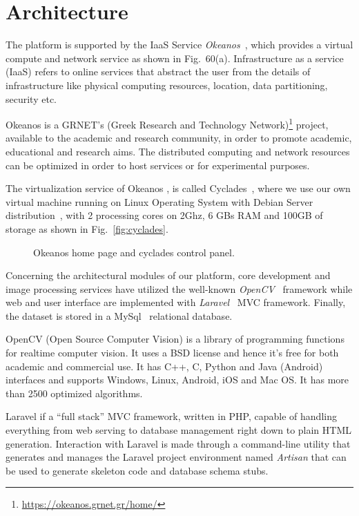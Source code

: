 \newpage
\section{Architecture}\label{architecture}

The platform is supported by the IaaS Service \textit{Okeanos}~\cite{okeanos}, which provides a virtual compute and network service as shown in Fig.~60(a).
Infrastructure as a service (IaaS) refers to online services that abstract the user from the details of infrastructure like physical computing resources, location, data partitioning, security etc.
 
Okeanos is a GRNET's (Greek Research and Technology Network)\footnote{\url{https://okeanos.grnet.gr/home/}} project, available to the academic and research community, in order to promote academic, educational and research aims. The distributed computing and network resources can be optimized in order to host services or for experimental purposes. 

The virtualization service of Okeanos , is called Cyclades~\cite{cyclades}, where we use our own virtual machine running on Linux Operating System with Debian Server distribution~\cite{debian}, with 2 processing cores on 2Ghz, 6 GBs RAM and 100GB of storage as shown in Fig.~\ref{fig:cyclades}.
\begin{figure}
    \centering
    \caption{Okeanos home page and cyclades control panel.}
\end{figure}
Concerning the architectural modules of our platform, core development and image processing services have  utilized the well-known \textit{OpenCV}~\cite{bradski2000opencv} framework while web and user interface are implemented with \textit{Laravel}~\cite{otwell2015laravel} MVC framework. Finally, the dataset is stored in a MySql~\cite{mysql2004mysql} relational database.
 
OpenCV (Open Source Computer Vision) is a library of programming functions for realtime computer vision. It uses a BSD license and hence it’s free for both academic and commercial use. It has C++, C, Python and Java (Android) interfaces and supports Windows, Linux, Android, iOS and Mac OS. It has more than 2500 optimized algorithms.
 
Laravel if a ``full stack'' MVC framework, written in PHP, capable of handling everything from web serving to database management right down to plain HTML generation. Interaction with Laravel is made through a command-line utility that generates and manages the Laravel project environment named \textit{Artisan} that can be used to generate skeleton code and database schema stubs.

